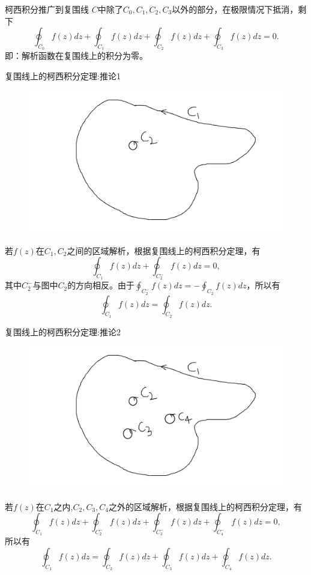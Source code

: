 \documentclass[11pt]{beamer}
\begin{document}
\begin{frame}{柯西积分推广到复围线}
$C$中除了$C_0, C_1, C_2, C_3$以外的部分，在极限情况下抵消，剩下
\begin{equation}
\oint_{C_0} f(z) dz + \oint_{C_1} f(z) dz + \oint_{C_2} f(z)dz + \oint_{C_3} f(z) dz = 0.
\end{equation}
即：解析函数在复围线上的积分为零。
\end{frame}

\begin{frame}{复围线上的柯西积分定理:推论1}
\begin{figure}
	\centering
	\includegraphics[width=0.5\linewidth]{复围线上的柯西积分定理1}
	\label{fig:1}
\end{figure}
若$f(z)$在$C_1,C_2$之间的区域解析，根据复围线上的柯西积分定理，有
\begin{equation}
\oint_{C_1} f(z) dz + \oint_{C^-_2} f(z) dz = 0,
\end{equation}
其中$C^-_2$与图中$C_2$的方向相反。由于$\oint_{C^-_2} f(z) dz = - \oint_{C_2} f(z) dz$，所以有
\begin{equation}
\oint_{C_1}f(z) dz = \oint_{C_2}f(z)dz.
\end{equation}
\end{frame}

\begin{frame}{复围线上的柯西积分定理:推论2}
\begin{figure}
	\centering
	\includegraphics[width=0.5\linewidth]{复围线上的柯西积分定理2}
	\label{fig:2}
\end{figure}
若$f(z)$在$C_1$之内,$C_2,C_3,C_4$之外的区域解析，根据复围线上的柯西积分定理，有
\begin{equation}
\oint_{C_1} f(z) dz + \oint_{C^-_2} f(z) dz + \oint_{C^-_3} f(z) dz + \oint_{C^-_4} f(z) dz = 0,
\end{equation}
所以有
\begin{equation}
\oint_{C_1}f(z) dz = \oint_{C_2}f(z)dz + \oint_{C_3}f(z) dz + \oint_{C_4} f(z) dz.
\end{equation}
\end{frame}
\end{document}
